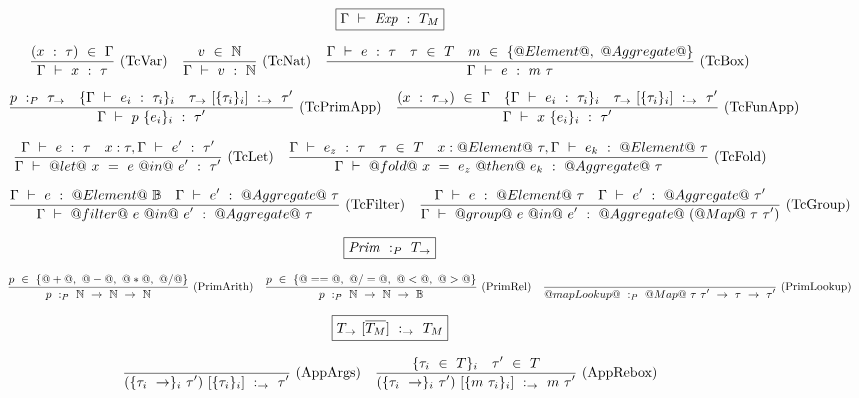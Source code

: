 
\begin{figure*}


$$
\boxed{\Gamma ~\vdash~ \mathit{Exp}~:~T_M}
$$


$$
\enskip \frac {\displaystyle 
    (x~:~\tau)~\in~\Gamma
} {\displaystyle  
    \Gamma ~\vdash~ x~:~\tau
} \  \mbox{(TcVar)} \enskip
\enskip \frac {\displaystyle 
  v~\in~\mathbb{N}
} {\displaystyle  
    \Gamma ~\vdash~ v~:~\mathbb{N}
} \  \mbox{(TcNat)} \enskip
\enskip \frac {\displaystyle 
  \Gamma ~\vdash~ e~:~\tau
  \quad
  \tau~\in~T
  \quad
  m~\in~\{@Element@,~@Aggregate@\}
} {\displaystyle  
    \Gamma ~\vdash~ e~:~m~\tau
} \  \mbox{(TcBox)} \enskip
$$

$$
\enskip \frac {\displaystyle 
    p~:_P~\tau_\to
    \quad
    \{ \Gamma ~\vdash~ e_i~:~\tau_i \}_i
    \quad
    \tau_\to~[\{\tau_i\}_i]~:_\to~\tau'
} {\displaystyle  
    \Gamma ~\vdash~ p~\{e_i\}_i~:~\tau'
} \  \mbox{(TcPrimApp)} \enskip
\enskip \frac {\displaystyle 
    (x~:~\tau_\to)~\in~\Gamma
    \quad
    \{ \Gamma ~\vdash~ e_i~:~\tau_i \}_i
    \quad
    \tau_\to~[\{\tau_i\}_i]~:_\to~\tau'
} {\displaystyle  
    \Gamma ~\vdash~ x~\{e_i\}_i~:~\tau'
} \  \mbox{(TcFunApp)} \enskip
$$

$$
\enskip \frac {\displaystyle 
  \Gamma ~\vdash~ e~:~\tau
  \quad
  x:\tau,\Gamma ~\vdash~ e'~:~\tau'
} {\displaystyle 
  \Gamma ~\vdash~ @let@~x~=~e~@in@~e'~:~\tau'
} \  \mbox{(TcLet)} \enskip
\enskip \frac {\displaystyle 
  \Gamma ~\vdash~ e_z~:~\tau
  \quad
  \tau~\in~T
  \quad
  x:@Element@~\tau,\Gamma ~\vdash~ e_k~:~@Element@~\tau
} {\displaystyle 
  \Gamma ~\vdash~ @fold@~x~=~e_z~@then@~e_k~:~@Aggregate@~\tau
} \  \mbox{(TcFold)} \enskip
$$

$$
\enskip \frac {\displaystyle 
  \Gamma ~\vdash~ e~:~@Element@~\mathbb{B}
  \quad
  \Gamma ~\vdash~ e'~:~@Aggregate@~\tau
} {\displaystyle 
  \Gamma ~\vdash~ @filter@~e~@in@~e'~:~@Aggregate@~\tau
} \  \mbox{(TcFilter)} \enskip
\enskip \frac {\displaystyle 
  \Gamma ~\vdash~ e~:~@Element@~\tau
  \quad
  \Gamma ~\vdash~ e'~:~@Aggregate@~\tau'
} {\displaystyle 
  \Gamma ~\vdash~ @group@~e~@in@~e'~:~@Aggregate@~(@Map@~\tau~\tau')
} \  \mbox{(TcGroup)} \enskip
$$


$$
\boxed{\mathit{Prim}~:_P~T_\to}
$$

$$
\enskip \frac {\displaystyle 
  p~\in~\{@+@,~@-@,~@*@,~@/@\}
} {\displaystyle 
  p~:_P~\mathbb{N}~\to~\mathbb{N}~\to~\mathbb{N}
} \  \mbox{(PrimArith)} \enskip
\enskip \frac {\displaystyle 
  p~\in~\{@==@,~@/=@,~@<@,~@>@\}
} {\displaystyle 
  p~:_P~\mathbb{N}~\to~\mathbb{N}~\to~\mathbb{B}
} \  \mbox{(PrimRel)} \enskip
\enskip \frac {\displaystyle } {\displaystyle 
  @mapLookup@~:_P~@Map@~\tau~\tau'~\to~\tau~\to~\tau'
} \  \mbox{(PrimLookup)} \enskip
$$

$$
\boxed{T_\to~[\overline{T_M}]~:_\to~T_M}
$$

$$
\enskip \frac {\displaystyle 
} {\displaystyle 
  (\{\tau_i~\to\}_i~\tau')~[\{\tau_i\}_i]~:_\to~\tau'
} \  \mbox{(AppArgs)} \enskip
\enskip \frac {\displaystyle 
  \{\tau_i~\in~T\}_i
  \quad
  \tau'~\in~T
} {\displaystyle 
  (\{\tau_i~\to\}_i~\tau')~[\{m~\tau_i\}_i]~:_\to~m~\tau'
} \  \mbox{(AppRebox)} \enskip
$$


\end{figure*}
